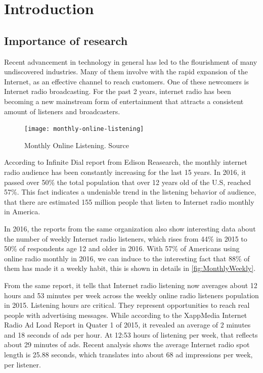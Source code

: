 \chapter{Introduction}
\section{Importance of research}
Recent advancement in technology in general has led to the flourishment of many undiscovered industries. Many of them involve with the rapid expansion of the Internet, as an effective channel to reach customers. One of these newcomers is Internet radio broadcasting. For the past 2 years, internet radio has been becoming a new mainstream form of entertainment that attracts a consistent amount 
of listeners and broadcasters. 
\begin{figure}[h]
	\centering
\texttt{[image: monthly-online-listening]}
 	\caption{Monthly Online Listening. Source\cite{edisonslide}}
 	\label{fig:MonthlyOnlineListening}
\end{figure}
According to Infinite Dial report from Edison Reasearch\cite{edison2016}, the monthly internet radio audience has been constantly increasing for the last 15 years. In 2016, it passed over 50\% the total population that over 12 years old of the U.S, reached 57\%. This fact indicates a undeniable trend in the listening behavior of audience, that there are estimated 155 million people that listen to Internet radio monthly in America. 

In 2016, the reports from the same organization also show interesting data about the number of weekly Internet radio listeners, which rises from 44\% in 2015 to 50\% of respondents age 12 and older in 2016. With 57\% of Americans using online radio monthly in 2016, we can induce to the interesting fact that 88\% of them has made it a weekly habit, this is shown in details in \ref{fig:MonthlyWeekly}. 

From the same report, it tells that Internet radio listening now
averages about 12 hours and 53 minutes per week across
the weekly online radio listeners population in 2015. Listening hours are critical. They
represent opportunities to reach real people with
advertising messages. While according to the XappMedia Internet Radio Ad Load Report in Quater 1 of 2015\cite{xapp2015q1}, it revealed an average of 2 minutes and 18 seconds of ads
per hour. At 12:53 hours of listening per week, that reflects
about 29 minutes of ads. Recent analysis shows the
average Internet radio spot length is 25.88 seconds, which
translates into about 68 ad impressions per week, per
listener. 

